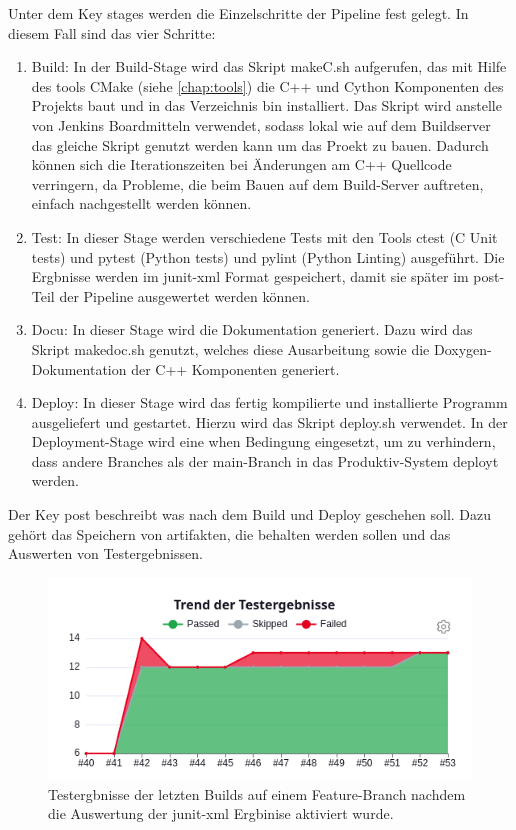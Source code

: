 Unter dem Key \glqq stages\grqq{} werden die Einzelschritte der Pipeline fest gelegt. In diesem Fall sind das vier Schritte:
\begin{enumerate}
    \item{Build:} In der Build-Stage wird das Skript makeC.sh aufgerufen, das mit Hilfe des tools CMake (siehe \autoref{chap:tools}) die C++ und Cython Komponenten des Projekts baut und in das Verzeichnis bin installiert. Das Skript wird anstelle von Jenkins Boardmitteln verwendet, sodass lokal wie auf dem Buildserver das gleiche Skript genutzt werden kann um das Proekt zu bauen. Dadurch können sich die Iterationszeiten bei Änderungen am C++ Quellcode verringern, da Probleme, die beim Bauen auf dem Build-Server auftreten, einfach nachgestellt werden können.
    \item{Test:} In dieser Stage werden verschiedene Tests mit den Tools ctest (C Unit tests) und pytest (Python tests) und pylint (Python Linting) ausgeführt. Die Ergbnisse werden im junit-xml Format gespeichert, damit sie später im \glqq post\grqq-Teil der Pipeline ausgewertet werden können.
    \item{Docu:} In dieser Stage wird die Dokumentation generiert. Dazu wird das Skript makedoc.sh genutzt, welches diese Ausarbeitung sowie die Doxygen-Dokumentation der C++ Komponenten generiert.
    \item{Deploy:} In dieser Stage wird das fertig kompilierte und installierte Programm ausgeliefert und gestartet. Hierzu wird das Skript deploy.sh verwendet.
    In der Deployment-Stage wird eine \glqq when\grqq{} Bedingung eingesetzt, um zu verhindern, dass andere Branches als der \glqq main\grqq-Branch in das Produktiv-System deployt werden.
\end{enumerate}

Der Key \glqq post\grqq{} beschreibt was nach dem Build und Deploy geschehen soll. Dazu gehört das Speichern von artifakten, die behalten werden sollen und das Auswerten von Testergebnissen.

\begin{figure}
    \label{fig:test_results}
    \centering
    \includegraphics[scale=0.4]{res/Jenkins_test_results.png}
    \caption{Testergbnisse der letzten Builds auf einem Feature-Branch nachdem die Auswertung der junit-xml Ergbinise aktiviert wurde.}
\end{figure}

